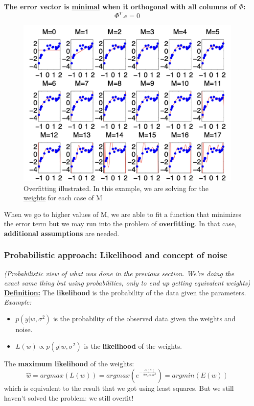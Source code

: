 \documentclass[a4paper,11pt]{article}
\begin{document}
\textbf{The error vector is \underline{minimal} when it orthogonal with all columns of $\Phi$:}
\[ \Phi^T.e = 0 \]
\begin{figure}[h]
	\centering
	\includegraphics[width=.8\linewidth]{figures/M.png}
	\caption{Overfitting illustrated. In this example, we are solving for the \underline{weights} for each case of M}
\end{figure}
When we go to higher values of M, we are able to fit a function that minimizes the error term but we may run into the problem of \textbf{overfitting}. In that case, \textbf{additional assumptions} are needed.
\subsubsection{Probabilistic approach: Likelihood and concept of noise}
\textit{(Probabilistic view of what was done in the previous section. We're doing the exact same thing but using probabilities, only to end up getting equivalent weights)}\vspace{5pt}\\
\underline{\textbf{Definition:}} The \textbf{likelihood} is the probability of the data given the parameters.\vspace{5pt}\\
\textit{Example:}
\begin{itemize}
	\item $p(y|w,\sigma^2)$ is the probability of the observed data given the weights and noise.
	\item $L(w) \propto p(y|w,\sigma^2)$ is the \textbf{likelihood} of the weights.
\end{itemize}
The \textbf{maximum likelihood} of the weights:
\[ \hat{w} = argmax(L(w)) = argmax(e^{-\frac{E(w)}{2 \sigma_noise^2}}) = argmin(E(w)) \]
which is equivalent to the result that we got using least squares. But we still haven't solved the problem: we still overfit!
\end{document}
